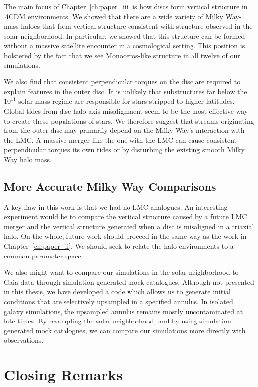 The main focus of Chapter~\ref{ch:paper_iii} is how discs form vertical structure in $\Lambda$CDM environments. We showed that there are a wide variety of Milky Way-mass haloes that form vertical structure consistent with structure observed in the solar neighborhood. In particular, we showed that this structure can be formed without a massive satellite encounter in a cosmological setting. This position is bolstered by the fact that we see Monoceros-like structure in all twelve of our simulations.

We also find that consistent perpendicular torques on the disc are required to explain features in the outer disc. It is unlikely that substructures far below the $10^{11}$ solar mass regime are responsible for stars stripped to higher latitudes. Global tides from disc-halo axis misalignment seem to be the most effective way to create these populations of stars. We therefore suggest that streams originating from the outer disc may primarily depend on the Milky Way's interaction with the LMC. A massive merger like the one with the LMC can cause consistent perpendicular torques its own tides or by disturbing the existing smooth Milky Way halo mass. 

\subsection{More Accurate Milky Way Comparisons}

A key flaw in this work is that we had no LMC analogues. An interesting experiment would be to compare the vertical structure caused by a future LMC merger and the vertical structure generated when a disc is misaligned in a triaxial halo. On the whole, future work should proceed in the same way as the work in Chapter~\ref{ch:paper_ii}. We should seek to relate the halo environments to a common parameter space.

We also might want to compare our simulations in the solar neighborhood to Gaia data through simulation-generated mock catalogues. Although not presented in this thesis, we have developed a code which allows us to generate initial conditions that are selectively upsampled in a specified annulus. In isolated galaxy simulations, the upsampled annulus remains mostly uncontaminated at late times. By resampling the solar neighborhood, and by using simulation-generated mock catalogues, we can compare our simulations more directly with observations.

\section{Closing Remarks}

